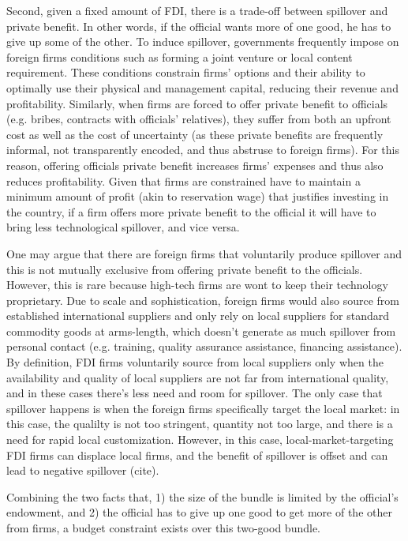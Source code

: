 Second, given a fixed amount of FDI, there is a trade-off between spillover and private benefit. In other words, if the official wants more of one good, he has to give up some of the other. To induce spillover, governments frequently impose on foreign firms conditions such as forming a joint venture or local content requirement. These conditions constrain firms' options and their ability to optimally use their physical and management capital, reducing their revenue and profitability. Similarly, when firms are forced to offer private benefit to officials (e.g. bribes, contracts with officials' relatives), they suffer from both an upfront cost as well as the cost of uncertainty (as these private benefits are frequently informal, not transparently encoded, and thus abstruse to foreign firms). For this reason, offering officials private benefit increases firms' expenses and thus also reduces profitability. Given that firms are constrained have to maintain a minimum amount of profit (akin to reservation wage) that justifies investing in the country, if a firm offers more private benefit to the official it will have to bring less technological spillover, and vice versa.

One may argue that there are foreign firms that voluntarily produce spillover and this is not mutually exclusive from offering private benefit to the officials. However, this is rare because high-tech firms are wont to keep their technology proprietary. Due to scale and sophistication, foreign firms would also source from established international suppliers and only rely on local suppliers for standard commodity goods at arms-length, which doesn't generate as much spillover from personal contact (e.g. training, quality assurance assistance, financing assistance). By definition, FDI firms voluntarily source from local suppliers only when the availability and quality of local suppliers are not far from international quality, and in these cases there's less need and room for spillover. The only case that spillover happens is when the foreign firms specifically target the local market: in this case, the qualilty is not too stringent, quantity not too large, and there is a need for rapid local customization. However, in this case, local-market-targeting FDI firms can displace local firms, and the benefit of spillover is offset and can lead to negative spillover (cite).

Combining the two facts that, 1) the size of the bundle is limited by the official's endowment, and 2) the official has to give up one good to get more of the other from firms, a budget constraint exists over this two-good bundle.

